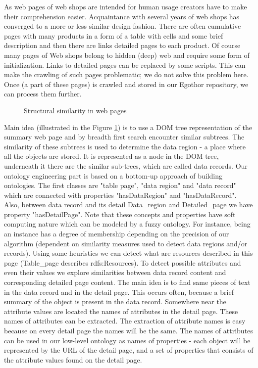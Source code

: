 \documentclass{sig-alternate}
\begin{document}
As web pages of web shops are intended for human usage creators have to make their comprehension easier. Acquaintance with several years of web shops has converged to a more or less similar design fashion. There are often cumulative pages with many products in a form of a table with cells and some brief description and then there are links detailed pages to each product. Of course many pages of Web shops belong to hidden (deep) web and require some form of initialization. Links to detailed pages can be replaced by some scripts. This can make the crawling of such pages problematic; we do not solve this problem here. Once (a part of these pages) is crawled and stored in our Egothor repository, we can process them further. 

\begin{figure}
\centering
{}
\caption{Structural similarity in web pages}
\label{img:StructuralSimilarity}
\end{figure}

Main idea (illustrated in the Figure \ref{img:StructuralSimilarity}) is to use a DOM tree representation of the summary web page and by breadth first search encounter similar subtrees. The similarity of these subtrees is used to determine the data region - a place where all the objects are stored. It is represented as a node in the DOM tree, underneath it there are the similar sub-trees, which are called data records. Our ontology engineering part is based on a bottom-up approach of building ontologies. The first classes are "table page", "data region" and "data record" which are connected with properties "hasDataRegion" and "hasDataRecord". Also, between data record and its detail Data\_region and Detailed\_page we have property "hasDetailPage". Note that these concepts and properties have soft computing nature which can be modeled by a fuzzy ontology. For instance, being an instance has a degree of membership depending on the precision of our algorithm (dependent on similarity measures used to detect data regions and/or records). Using some heuristics we can detect what are resources described in this page (Table\_page describes rdfs:Resources). To detect possible attributes and even their values we explore similarities between data record content and corresponding detailed page content. The main idea is to find same pieces of text in the data record and in the detail page. This occurs often, because a brief summary of the object is present in the data record. Somewhere near the attribute values are located the names of attributes in the detail page. These names of attributes can be extracted. The extraction of attribute names is easy because on every detail page the names will be the same.  The names of attributes can be used in our low-level ontology as names of properties - each object will be represented by the URL of the detail page, and a set of properties that consists of the attribute values found on the detail page.
\end{document}
